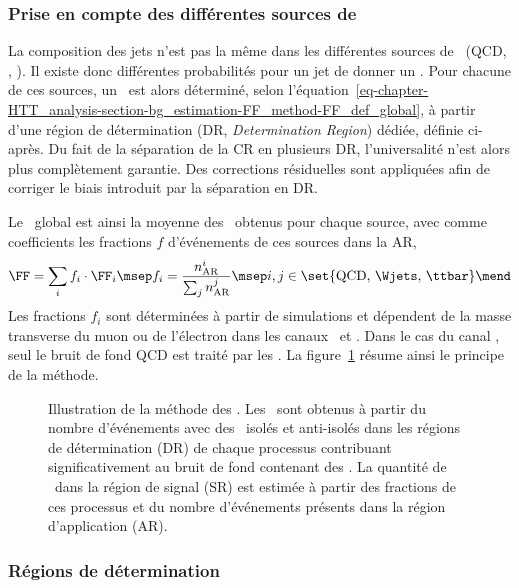 \subsubsection{Prise en compte des différentes sources de \ftauhs}
La composition des jets n'est pas la même dans les différentes sources de \ftauhs\ (QCD, \Wjets, \ttbar).
Il existe donc différentes probabilités pour un jet de donner un \ftauh.
Pour chacune de ces sources, un \fakefactor\ est alors déterminé, selon l'équation~\eqref{eq-chapter-HTT_analysis-section-bg_estimation-FF_method-FF_def_global}, à partir d'une région de détermination (DR, \emph{Determination Region}) dédiée, définie ci-après.
Du fait de la séparation de la CR en plusieurs DR, l'universalité n'est alors plus complètement garantie.
Des corrections résiduelles sont appliquées afin de corriger le biais introduit par la séparation en DR.
\par
Le \fakefactor\ global est ainsi la moyenne des \fakefactors\ obtenus pour chaque source, avec comme coefficients les fractions $f$ d'événements de ces sources dans la AR, \ie
\begin{equation}
\FF = \sum_i f_i \cdot \FF_i
\msep
f_i = \frac{n_\text{AR}^i}{\sum_j n_\text{AR}^{j}}
\msep
i,j \in \set{\text{QCD, \Wjets, \ttbar}}
\mend
\end{equation}
Les fractions $f_i$ sont déterminées à partir de simulations et dépendent de la masse transverse du muon ou de l'électron dans les canaux \mu\tauh\ et \ele\tauh.
Dans le cas du canal \tauh\tauh, seul le bruit de fond QCD est traité par les \fakefactors.
La figure~\ref{fig-chapter-HTT_analysis-section-bg_estimation-FF_method-ppe} résume ainsi le principe de la méthode.
\begin{figure}[h]
\centering

\caption[Illustration de la méthode des \fakefactors.]{Illustration de la méthode des \fakefactors. Les \fakefactors\ sont obtenus à partir du nombre d'événements avec des \tauh\ isolés et anti-isolés dans les régions de détermination (DR) de chaque processus contribuant significativement au bruit de fond contenant des \ftauhs. La quantité de \ftauhs\ dans la région de signal (SR) est estimée à partir des fractions de ces processus et du nombre d'événements présents dans la région d'application (AR).}
\label{fig-chapter-HTT_analysis-section-bg_estimation-FF_method-ppe}
\end{figure}
\subsubsection{Régions de détermination}
